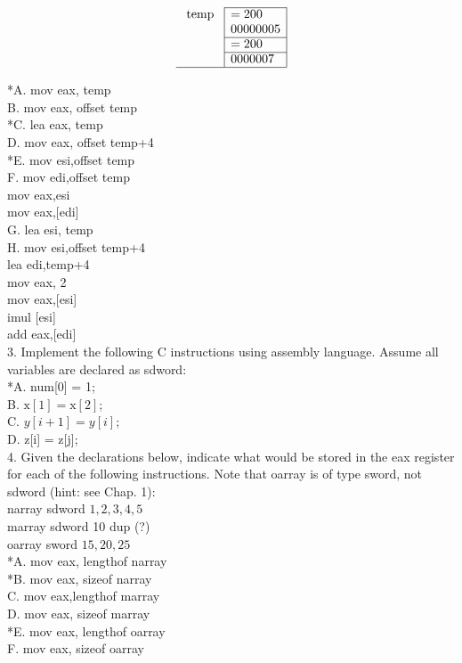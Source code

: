 \documentclass[10pt]{article}
\begin{document}
$$
\begin{array}{r|l|}
\cline { 2 - 2 } \text { temp } & =200 \\
& 00000005 \\
\cline { 2 - 2 } & =200 \\
\cline { 2 - 2 } & 0000007 \\
\hline
\end{array}
$$

*A. mov eax, temp\\
B. mov eax, offset temp\\
*C. lea eax, temp\\
D. mov eax, offset temp+4\\
*E. mov esi,offset temp\\
F. mov edi,offset temp\\
mov eax,esi\\[0pt]
mov eax,[edi]\\
G. lea esi, temp\\
H. mov esi,offset temp+4\\
lea edi,temp+4\\
mov eax, 2\\[0pt]
mov eax,[esi]\\[0pt]
imul [esi]\\[0pt]
add eax,[edi]\\
3. Implement the following C instructions using assembly language. Assume all variables are declared as sdword:\\[0pt]
*A. num[0] = 1;\\
B. $\mathrm{x}[1]=\mathrm{x}[2]$;\\
C. $y[i+1]=y[i]$;\\[0pt]
D. z[i] = z[j];\\
4. Given the declarations below, indicate what would be stored in the eax register for each of the following instructions. Note that oarray is of type sword, not sdword (hint: see Chap. 1):\\
narray sdword $1,2,3,4,5$\\
marray sdword 10 dup (?)\\
oarray sword $15,20,25$\\
*A. mov eax, lengthof narray\\
*B. mov eax, sizeof narray\\
C. mov eax,lengthof marray\\
D. mov eax, sizeof marray\\
*E. mov eax, lengthof oarray\\
F. mov eax, sizeof oarray\\
\end{document}

